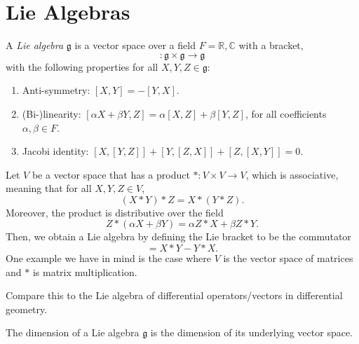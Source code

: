 \chapter{Lie Algebras}%
\label{cha:lie_algebras}

\begin{definition} \label{def:lie_algebra}
  A \emph{Lie algebra} $\mathfrak{g}$ is a vector space over a field $F = \mathbb{R}, \mathbb{C}$ with a bracket, 
  \begin{equation}
    [\bullet, \bullet]\colon \mathfrak{g} \times \mathfrak{g} \to \mathfrak{g}
  \end{equation}
  with the following properties for all $X, Y, Z \in \mathfrak{g}$:
  \begin{enumerate}
    \item Anti-symmetry: $[X, Y] = -[Y, X]$.
    \item (Bi-)linearity: $[\alpha X + \beta Y, Z] = \alpha[X, Z] + \beta [Y, Z]$, for all coefficients $\alpha, \beta \in F$.
    \item Jacobi identity: $[X, [Y, Z] ] + [Y, [Z, X] ] + [Z, [X, Y] ] = 0$.
  \end{enumerate}
\end{definition}

Let $V$ be a vector space that has a product $*: V \times V \to V$, which is associative, meaning that for all $X, Y, Z \in V$,
\begin{equation}
  (X * Y) * Z = X*(Y*Z).
\end{equation}
Moreover, the product is distributive over the field
\begin{equation}
  Z * (\alpha X + \beta Y) = \alpha Z*X + \beta Z*Y.
\end{equation}
Then, we obtain a Lie algebra by defining the Lie bracket to be the commutator
\begin{equation}
  [X, Y] = X*Y - Y*X.
\end{equation}
One example we have in mind is the case where $V$ is the vector space of matrices and $*$ is matrix multiplication. 
\begin{leftbar}
  \begin{remark}
    Compare this to the Lie algebra of differential operators/vectors in differential geometry.
  \end{remark}
\end{leftbar}

\begin{definition}[dimension]
  The dimension of a Lie algebra $\mathfrak{g}$ is the dimension of its underlying vector space.
\end{definition}

